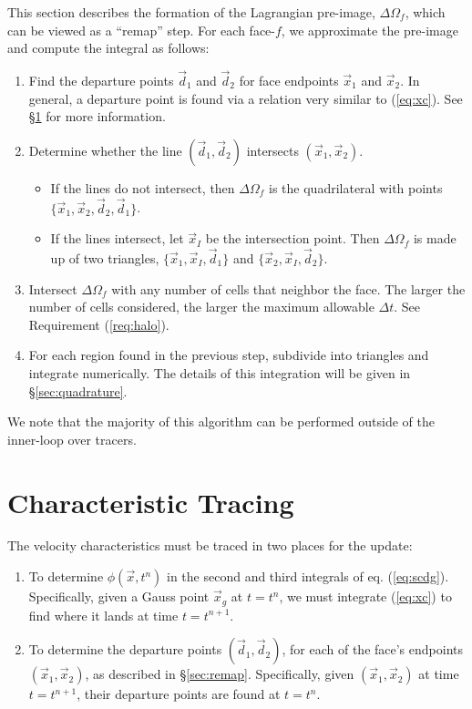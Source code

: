 \documentclass[11pt]{report}
\newcommand{\svec}[1]{{\Vec{#1}}}
\begin{document}
This section describes the formation of the Lagrangian pre-image,
$\Delta\Omega_{f}$, which can be viewed as a ``remap'' step.  For each
face-$f$, we approximate the pre-image and compute the integral as follows:
\begin{enumerate}
\item Find the departure points $\svec{d}_1$ and $\svec{d}_2$ for face
  endpoints $\svec{x}_1$ and $\svec{x}_2$.  In general, a
  departure point is found via a relation very similar to (\ref{eq:xc}).  See
  \S\ref{sec:characteristic} for more information.
\item Determine whether the line $(\svec{d}_1, \svec{d}_2)$ intersects
  $(\svec{x}_1, \svec{x}_2)$.
  \begin{itemize}
  \item If the lines do not intersect, then $\Delta\Omega_{f}$ is the
    quadrilateral with points $\{\svec{x}_1, \svec{x}_2, \svec{d}_2,
    \svec{d}_1\}$.
  \item If the lines intersect, let $\svec{x}_I$ be the
    intersection point.  Then $\Delta\Omega_{f}$ is made up of
    two triangles, $\{\svec{x}_1, \svec{x}_I, \svec{d}_1\}$ and $\{\svec{x}_2,
    \svec{x}_I, \svec{d}_2\}$. 
  \end{itemize}
\item Intersect $\Delta\Omega_{f}$ with any number of cells that neighbor
  the face.  The larger the number of cells considered, the larger the maximum
  allowable $\Delta t$.  See Requirement (\ref{req:halo}).
\item For each region found in the previous step, subdivide into triangles and
  integrate numerically.  The details of this integration will be given in
  \S\ref{sec:quadrature}.
\end{enumerate}
We note that the majority of this algorithm can be performed outside of
the inner-loop over tracers.

\section{Characteristic Tracing}
\label{sec:characteristic}

The velocity characteristics must be traced in two places for the update:
\begin{enumerate}
\item To determine $\phi(\svec{x},t^n)$ in the second and third integrals of
  eq. (\ref{eq:scdg}).  Specifically, given a Gauss point $\svec{x}_g$ at
  $t=t^n$, we must integrate (\ref{eq:xc}) to find where it lands at time
  $t=t^{n+1}$.
\item To determine the departure points $(\svec{d}_1, \svec{d}_2)$, for each
  of the face's endpoints $(\svec{x}_1, \svec{x}_2)$, as described in
  \S\ref{sec:remap}.  Specifically, given $(\svec{x}_1, \svec{x}_2)$ at
  time $t=t^{n+1}$, their departure points are found at $t=t^n$.
\end{enumerate}
\end{document}
